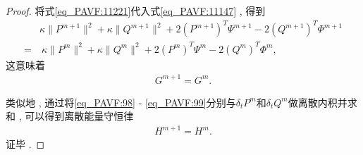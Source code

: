 \begin{proof}
将式\eqref{eq_PAVF:11221}代入式\eqref{eq_PAVF:11147} , 得到
\begin{align}
&\kappa \|P^{m+1}\|^2+\kappa \|Q^{m+1}\|^2+2(P^{m+1})^{T}\Psi^{m+1}-2(Q^{m+1})^{T}\varPhi^{m+1}\nonumber
\\=&~\kappa \|P^{m}\|^2+\kappa \|Q^{m}\|^2+2(P^{m})^{T}\Psi^{m}-2(Q^{m})^{T}\varPhi^{m} , \label{eq_PAVF:11155}
\end{align}
这意味着
\begin{align}\label{eq_PAVF:11149}
G^{m+1}=G^{m}  . 
\end{align}

类似地 , 通过将\eqref{eq_PAVF:98} - \eqref{eq_PAVF:99}分别与$\delta_t P^{m}$和$\delta_t Q^{m}$做离散内积并求和 , 可以得到离散能量守恒律
\begin{align}\label{eq_PAVF:11156}
H^{m+1}=H^{m} . 
\end{align}
证毕 . 
\end{proof}

